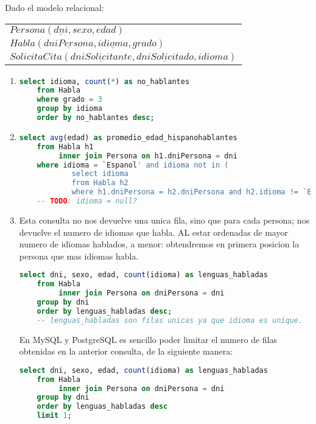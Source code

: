 Dado el modelo relacional:
\begin{center}
	\begin{tabular}{l}
		$Persona(\underline{dni}, sexo, edad)$\\
		$Habla(\underline{dniPersona}, \underline{idioma}, grado)$\\
		$SolicitaCita(\underline{dniSolicitante}, \underline{dniSolicitado}, idioma)$\\	
	\end{tabular}
\end{center}

\begin{enumerate}
	
	\item 
	\begin{lstlisting}[language=sql]
	select idioma, count(*) as no_hablantes
	from Habla
	where grado = 3
	group by idioma
	order by no_hablantes desc;\end{lstlisting}
	
	\item 
	\begin{lstlisting}[language=sql]
	select avg(edad) as promedio_edad_hispanohablantes
	from Habla h1
		 inner join Persona on h1.dniPersona = dni
	where idioma = `Espanol' and idioma not in (
			select idioma
			from Habla h2
			where h1.dniPersona = h2.dniPersona and h2.idioma != `Espanol');
	-- TODO: idioma = null?\end{lstlisting}

	\item 
	Esta consulta no nos devuelve una unica fila, sino que para cada persona; nos devuelve el numero de idiomas que habla. AL estar ordenadas de mayor numero de idiomas hablados, a menor: obtendremos en primera posicion la persona que mas idiomas habla.
	\begin{lstlisting}[language=sql]
	select dni, sexo, edad, count(idioma) as lenguas_habladas
	from Habla
		 inner join Persona on dniPersona = dni
	group by dni
	order by lenguas_habladas desc;
	-- lenguas_habladas son filas unicas ya que idioma es unique.\end{lstlisting}
	
	\newpage
	En MySQL y PostgreSQL es sencillo poder limitar el numero de filas obtenidas en la anterior consulta, de la siguiente manera:
	\begin{lstlisting}[language=sql]
	select dni, sexo, edad, count(idioma) as lenguas_habladas
	from Habla
		 inner join Persona on dniPersona = dni
	group by dni
	order by lenguas_habladas desc
	limit 1;\end{lstlisting}
	

\end{enumerate}
